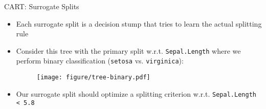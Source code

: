 \documentclass[11pt,compress,t,notes=noshow, xcolor=table]{beamer}
\begin{document}
\begin{vbframe}{CART: Surrogate Splits}
\begin{itemize}
\item Each surrogate split is a decision stump that tries to learn the actual splitting rule
\item Consider this tree with the primary split w.r.t. \texttt{Sepal.Length} where we perform binary classification (\texttt{setosa} vs. \texttt{virginica}):
\begin{figure}
\texttt{[image: figure/tree-binary.pdf]} 
\end{figure}
\item Our surrogate split should optimize a splitting criterion w.r.t. \texttt{Sepal.Length < 5.8}
\end{itemize}



\end{vbframe}
\end{document}
